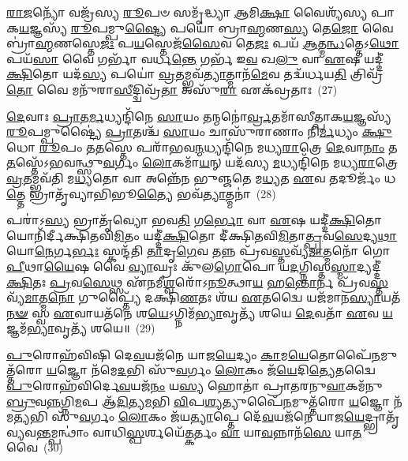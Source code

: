 \-\ul{𑌰𑌾}\-\-\ul{𑌜}\-𑌨𑍍𑌯𑍋᳴ 𑌵𑌜𑍍𑌰᳴𑌸𑍍𑌯 \ul{𑌰𑍂}\-𑌪𑍞 𑌸𑌮𑍃᳴𑌦𑍍𑌧𑍍𑌯𑌾 \ul{𑌆}\-𑌮𑌿\-\ul{𑌕𑍍𑌷𑌾} 𑌵𑍈𑌶𑍍𑌯᳴𑌸𑍍𑌯 𑌪𑌾𑌕\-\ul{𑌯}\-𑌜𑍍𑌞𑌸𑍍𑌯᳴ \ul{𑌰𑍂}\-𑌪𑌮𑍍𑌪𑍁\-\ul{𑌷𑍍𑌟𑍍𑌯𑍈} 𑌪𑌯𑍋॑ 𑌬𑍍𑌰𑌾\-\ul{𑌹𑍍𑌮}\-𑌣\-\ul{𑌸𑍍𑌯} 𑌤𑍇\-\ul{𑌜𑍋} 𑌵𑍈 𑌬𑍍𑌰𑌾॑\-\ul{𑌹𑍍𑌮}\-𑌣𑌸𑍍𑌤𑍇\-\ul{𑌜𑌃} 𑌪\-\ul{𑌯}\-𑌸𑍍𑌤𑍇𑌜᳴\-\ul{𑌸𑍈}\-𑌵 𑌤𑍇\-\ul{𑌜𑌃} 𑌪𑌯᳴ \ul{𑌆}\-𑌤𑍍𑌮\-\ul{𑌨𑍍𑌧}\-𑌤𑍍𑌤𑍇\-𑌽\-\ul{𑌥𑍋} 𑌪𑌯᳴\-\ul{𑌸𑌾} 𑌵𑍈 𑌗𑌰𑍍𑌭𑌾᳴ 𑌵𑌰𑍍𑌧\-\ul{𑌨𑍍𑌤𑍇} 𑌗𑌰𑍍𑌭᳴ 𑌇\-\ul{𑌵} 𑌖\-\ul{𑌲𑍁} 𑌵𑌾 \ul{𑌏}\-𑌷 𑌯𑌦𑍍𑌦𑍀॑\-\ul{𑌕𑍍𑌷𑌿}\-𑌤𑍋 𑌯𑌦᳴\-\ul{𑌸𑍍𑌯} 𑌪𑌯𑍋॑ \ul{𑌵𑍍𑌰}\-𑌤𑌮𑍍𑌭𑌵᳴\-\ul{𑌤𑍍𑌯𑌾}\-𑌤𑍍𑌮𑌾𑌨᳴\-\ul{𑌮𑍇}\-𑌵 𑌤𑌦𑍍𑌵᳴𑌰𑍍𑌧𑌯\-\ul{𑌤𑌿} 𑌤𑍍𑌰𑌿𑌵𑍍𑌰᳴\-\ul{𑌤𑍋} 𑌵𑍈 𑌮𑌨𑍁᳴𑌰𑌾\-\ul{𑌸𑍀}\-𑌦𑍍𑌦𑍍𑌵𑌿𑌵𑍍𑌰᳴\-\ul{𑌤𑌾} 𑌅𑌸𑍁᳴\-\ul{𑌰𑌾} 𑌏𑌕᳴𑌵𑍍𑌰𑌤𑌾𑌃~(27)

\-\ul{𑌦𑍇}\-𑌵𑌾𑌃 \ul{𑌪𑍍𑌰𑌾}\-𑌤\-\ul{𑌰𑍍𑌮}\-𑌧𑍍𑌯𑌨𑍍𑌦𑌿᳴𑌨𑍇 \ul{𑌸𑌾}\-𑌯𑌂 𑌤𑌨𑍍𑌮𑌨𑍋॑\-\ul{𑌰𑍍𑌵𑍍𑌰}\-𑌤𑌮𑌾᳴𑌸𑍀𑌤𑍍𑌪𑌾𑌕\-\ul{𑌯}\-𑌜𑍍𑌞𑌸𑍍𑌯᳴ \ul{𑌰𑍂}\-𑌪𑌮𑍍𑌪𑍁𑌷𑍍𑌟𑍍𑌯𑍈॑ \ul{𑌪𑍍𑌰𑌾}\-𑌤𑌶𑍍𑌚᳴ \ul{𑌸𑌾}\-𑌯𑌂 𑌚𑌾𑌸𑍁᳴𑌰𑌾𑌣𑌾𑌂 𑌨𑌿\-\ul{𑌰𑍍𑌮}\-𑌧𑍍𑌯𑌂 \ul{𑌕𑍍𑌷𑍁}\-𑌧𑍋 \ul{𑌰𑍂}\-𑌪𑌂 𑌤\-\ul{𑌤}\-𑌸𑍍𑌤𑍇 𑌪𑌰𑌾᳴𑌭𑌵\-\ul{𑌨𑍍𑌮}\-𑌧𑍍𑌯𑌨𑍍𑌦𑌿᳴𑌨𑍇 𑌮𑌧𑍍𑌯\-\ul{𑌰𑌾}\-𑌤𑍍𑌰𑍇 \ul{𑌦𑍇}\-𑌵𑌾\-\ul{𑌨𑌾𑌂} 𑌤\-\ul{𑌤}\-𑌸𑍍𑌤𑍇᳴\-𑌽𑌭𑌵𑌨𑍍𑌥𑍍𑌸𑍁\-\ul{𑌵}\-𑌰𑍍𑌗𑌂 \ul{𑌲𑍋}\-𑌕𑌮𑌾᳴\-\ul{𑌯}\-𑌨𑍍 𑌯𑌦᳴𑌸𑍍𑌯 \ul{𑌮}\-𑌧𑍍𑌯𑌨𑍍𑌦𑌿᳴𑌨𑍇 𑌮𑌧𑍍𑌯\-\ul{𑌰𑌾}\-𑌤𑍍𑌰𑍇 \ul{𑌵𑍍𑌰}\-𑌤𑌮𑍍𑌭𑌵᳴𑌤𑌿 𑌮\-\ul{𑌧𑍍𑌯}\-𑌤𑍋 𑌵𑌾 𑌅𑌨𑍍𑌨𑍇᳴𑌨 𑌭𑍁𑌞𑍍𑌜𑌤𑍇 𑌮\-\ul{𑌧𑍍𑌯}\-𑌤 \ul{𑌏}\-𑌵 𑌤𑌦𑍂𑌰𑍍𑌜𑌂᳴ 𑌧\-\ul{𑌤𑍍𑌤𑍇} 𑌭𑍍𑌰𑌾𑌤𑍃᳴𑌵𑍍𑌯𑌾𑌭𑌿𑌭𑍂\-\ul{𑌤𑍍𑌯𑍈} 𑌭𑌵᳴\-\ul{𑌤𑍍𑌯𑌾}\-𑌤𑍍𑌮𑌨𑌾॑~(28)




𑌪𑌰𑌾॑\-𑌽\-\ul{𑌸𑍍𑌯} 𑌭𑍍𑌰𑌾𑌤𑍃᳴𑌵𑍍𑌯𑍋 𑌭𑌵\-\ul{𑌤𑌿} 𑌗\-\ul{𑌰𑍍𑌭𑍋} 𑌵𑌾 \ul{𑌏}\-𑌷 𑌯𑌦𑍍𑌦𑍀॑\-\ul{𑌕𑍍𑌷𑌿}\-𑌤𑍋 𑌯𑍋𑌨𑌿᳴𑌰𑍍𑌦𑍀𑌕𑍍𑌷𑌿𑌤𑌵𑌿\-\ul{𑌮𑌿}\-𑌤𑌂 𑌯𑌦𑍍𑌦𑍀॑\-\ul{𑌕𑍍𑌷𑌿}\-𑌤𑍋 𑌦𑍀॑𑌕𑍍𑌷𑌿𑌤𑌵𑌿\-\ul{𑌮𑌿}\-𑌤𑌾\-\ul{𑌤𑍍𑌪𑍍𑌰}\-𑌵\-\ul{𑌸𑍇}\-𑌦𑍍𑌯\-\ul{𑌥𑌾} 𑌯𑍋\-\ul{𑌨𑍇}\-𑌰𑍍𑌗\-\ul{𑌰𑍍𑌭𑌃} 𑌸𑍍𑌕𑌨𑍍𑌦᳴𑌤𑌿 \ul{𑌤𑌾}\-𑌦𑍃\-\ul{𑌗𑍇}\-𑌵 𑌤𑌨𑍍𑌨 𑌪𑍍𑌰᳴𑌵\-\ul{𑌸𑍍𑌤}\-𑌵𑍍𑌯᳴\-\ul{𑌮𑌾}\-𑌤𑍍𑌮𑌨𑍋᳴ 𑌗𑍋\-\ul{𑌪𑍀}\-𑌥𑌾\-\ul{𑌯𑍈}\-𑌷 𑌵𑍈 \ul{𑌵𑍍𑌯𑌾}\-𑌘𑍍𑌰𑌃 𑌕𑍁᳴𑌲\-\ul{𑌗𑍋}\-𑌪𑍋 𑌯\-\ul{𑌦}\-𑌗𑍍𑌨𑌿𑌸𑍍𑌤\-\ul{𑌸𑍍𑌮𑌾}\-𑌦𑍍𑌯𑌦𑍍𑌦𑍀॑\-\ul{𑌕𑍍𑌷𑌿}\-𑌤𑌃 \ul{𑌪𑍍𑌰}\-𑌵\-\ul{𑌸𑍇}\-𑌥𑍍𑌸 𑌏᳴𑌨𑌮𑍀\-\ul{𑌶𑍍𑌵}\-𑌰𑍋᳴\-𑌽\-\ul{𑌨𑍂}\-𑌤𑍍𑌥𑌾\-\ul{𑌯} 𑌹\-\ul{𑌨𑍍𑌤𑍋}\-𑌰𑍍𑌨 𑌪𑍍𑌰᳴𑌵\-\ul{𑌸𑍍𑌤}\-𑌵𑍍𑌯᳴\-\ul{𑌮𑌾}\-𑌤𑍍𑌮\-\ul{𑌨𑍋} 𑌗𑍁𑌪𑍍𑌤𑍍𑌯𑍈᳴ 𑌦𑌕𑍍𑌷𑌿\-\ul{𑌣}\-𑌤𑌃 𑌶᳴𑌯 \ul{𑌏}\-𑌤𑌦𑍍𑌵𑍈 𑌯𑌜᳴𑌮𑌾𑌨\-\ul{𑌸𑍍𑌯𑌾}\-𑌯𑌤᳴\-\ul{𑌨}\-\-\ul{𑍟} 𑌸𑍍𑌵 \ul{𑌏}\-𑌵𑌾𑌯𑌤᳴𑌨𑍇 𑌶\-\ul{𑌯𑍇}\-\-𑌽𑌗𑍍𑌨𑌿𑌮᳴\-\ul{𑌭𑍍𑌯𑌾}\-𑌵𑍃𑌤𑍍𑌯᳴ 𑌶𑌯𑍇 \ul{𑌦𑍇}\-𑌵𑌤𑌾᳴ \ul{𑌏}\-𑌵 \ul{𑌯}\-𑌜𑍍𑌞𑌮᳴\-\ul{𑌭𑍍𑌯𑌾}\-𑌵𑍃𑌤𑍍𑌯᳴ 𑌶𑌯𑍇॥~(29)

{\anuvakamend[{\-\ul{𑌏}\-𑌤𑌦𑍍𑌵𑍈 \ul{𑌕𑍍𑌰𑍂}\-𑌰 \ul{𑌇}\-𑌵𑍈𑌕᳴𑌵𑍍𑌰𑌤𑌾 \ul{𑌆}\-𑌤𑍍𑌮\-\ul{𑌨𑌾} 𑌯𑌜᳴𑌮𑌾𑌨\-\ul{𑌸𑍍𑌯} 𑌤𑍍𑌰𑌯𑍋᳴𑌦𑌶 𑌚}]}%

\-\ul{𑌪𑍁}\-𑌰𑍋𑌹᳴𑌵𑌿𑌷𑌿 𑌦𑍇\-\ul{𑌵}\-𑌯𑌜᳴𑌨𑍇 𑌯𑌾𑌜\-\ul{𑌯𑍇}\-𑌦𑍍𑌯𑌂 \ul{𑌕𑌾}\-𑌮\-\ul{𑌯𑍇}\-𑌤𑍋𑌪𑍈᳴\-\ul{𑌨}\-𑌮𑍁𑌤𑍍𑌤᳴𑌰𑍋 \ul{𑌯}\-𑌜𑍍𑌞𑍋 𑌨᳴𑌮𑍇\-\ul{𑌦}\-𑌭𑌿 𑌸𑍁᳴\-\ul{𑌵}\-𑌰𑍍𑌗𑌂 \ul{𑌲𑍋}\-𑌕𑌂 𑌜᳴\-\ul{𑌯𑍇}\-𑌦𑌿\-\ul{𑌤𑍍𑌯𑍇}\-𑌤𑌦𑍍𑌵𑍈 \ul{𑌪𑍁}\-𑌰𑍋𑌹᳴𑌵𑌿𑌰𑍍𑌦𑍇\-\ul{𑌵}\-𑌯𑌜᳴\-\ul{𑌨𑌂} 𑌯\-\ul{𑌸𑍍𑌯} 𑌹𑍋𑌤𑌾॑ 𑌪𑍍𑌰𑌾𑌤𑌰𑌨𑍁\-\ul{𑌵𑌾}\-𑌕𑌮᳴𑌨𑍁\-\ul{𑌬𑍍𑌰𑍁}\-𑌵\-\ul{𑌨𑍍𑌨}\-𑌗𑍍𑌨𑌿\-\ul{𑌮}\-𑌪 𑌆᳴\-\ul{𑌦𑌿}\-𑌤𑍍𑌯\-\ul{𑌮}\-𑌭𑌿 \ul{𑌵𑌿}\-𑌪\-\ul{𑌶𑍍𑌯}\-𑌤𑍍𑌯𑍁𑌪𑍈᳴\-\ul{𑌨}\-𑌮𑍁𑌤𑍍𑌤᳴𑌰𑍋 \ul{𑌯}\-𑌜𑍍𑌞𑍋 𑌨᳴𑌮\-\ul{𑌤𑍍𑌯}\-𑌭𑌿 𑌸𑍁᳴\-\ul{𑌵}\-𑌰𑍍𑌗𑌂 \ul{𑌲𑍋}\-𑌕𑌂 𑌜᳴𑌯\-\ul{𑌤𑍍𑌯𑌾}\-𑌪𑍍𑌤𑍇 𑌦𑍇᳴\-\ul{𑌵}\-𑌯𑌜᳴𑌨𑍇 𑌯𑌾𑌜\-\ul{𑌯𑍇}\-𑌦𑍍𑌭𑍍𑌰𑌾𑌤𑍃᳴𑌵𑍍𑌯𑌵\-\ul{𑌨𑍍𑌤}\-𑌮𑍍𑌪𑌨𑍍𑌥𑌾𑌂॑ 𑌵𑌾𑌧𑌿\-\ul{𑌸𑍍𑌪}\-𑌰𑍍\mbox{}𑌶𑌯𑍇᳴\-\ul{𑌤𑍍𑌕}\-𑌰𑍍𑌤𑌂 \ul{𑌵𑌾} 𑌯𑌾\-\ul{𑌵}\-𑌨𑍍𑌨𑌾𑌨᳴\-\ul{𑌸𑍇} 𑌯𑌾\-\ul{𑌤}\-𑌵𑍈~(30)

